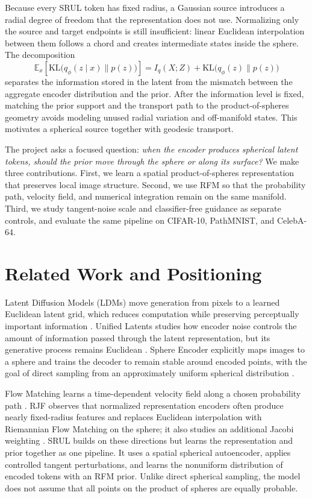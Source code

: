 \documentclass{article}
\begin{document}
Because every SRUL token has fixed radius, a Gaussian source introduces a radial degree of freedom that the representation does not use. Normalizing only the source and target endpoints is still insufficient: linear Euclidean interpolation between them follows a chord and creates intermediate states inside the sphere. The decomposition
\begin{equation}
\mathbb E_x\!\left[\mathrm{KL}\big(q_\phi(z\mid x)\|p(z)\big)\right]
= I_q(X;Z)+\mathrm{KL}\big(q_\phi(z)\|p(z)\big)
\label{eq:kl}
\end{equation}
separates the information stored in the latent from the mismatch between the aggregate encoder distribution and the prior. After the information level is fixed, matching the prior support and the transport path to the product-of-spheres geometry avoids modeling unused radial variation and off-manifold states. This motivates a spherical source together with geodesic transport.

The project asks a focused question: \emph{when the encoder produces spherical latent tokens, should the prior move through the sphere or along its surface?} We make three contributions. First, we learn a spatial product-of-spheres representation that preserves local image structure. Second, we use RFM so that the probability path, velocity field, and numerical integration remain on the same manifold. Third, we study tangent-noise scale and classifier-free guidance as separate controls, and evaluate the same pipeline on CIFAR-10, PathMNIST, and CelebA-64.

\section{Related Work and Positioning}
Latent Diffusion Models (LDMs) move generation from pixels to a learned Euclidean latent grid, which reduces computation while preserving perceptually important information \cite{ldm}. Unified Latents studies how encoder noise controls the amount of information passed through the latent representation, but its generative process remains Euclidean \cite{ul}. Sphere Encoder explicitly maps images to a sphere and trains the decoder to remain stable around encoded points, with the goal of direct sampling from an approximately uniform spherical distribution \cite{sphere}.

Flow Matching learns a time-dependent velocity field along a chosen probability path \cite{fm}. RJF observes that normalized representation encoders often produce nearly fixed-radius features and replaces Euclidean interpolation with Riemannian Flow Matching on the sphere; it also studies an additional Jacobi weighting \cite{rjf}. SRUL builds on these directions but learns the representation and prior together as one pipeline. It uses a spatial spherical autoencoder, applies controlled tangent perturbations, and learns the nonuniform distribution of encoded tokens with an RFM prior. Unlike direct spherical sampling, the model does not assume that all points on the product of spheres are equally probable.
\end{document}
